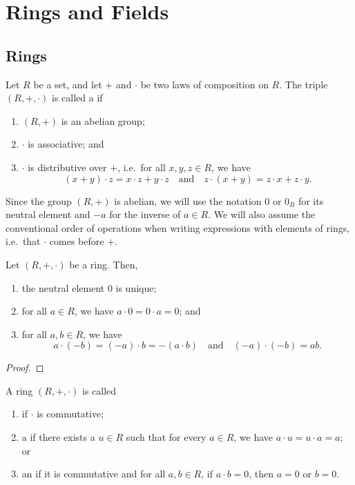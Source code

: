 \chapter{Rings and Fields}

\section{Rings}

\begin{defn}
Let $ R $ be a set, and let $ + $ and $ \cdot $ be two laws of composition on $ R $. The triple $ (R,+,\cdot) $ is called a  if
\begin{enumerate}
    \item $ (R,+) $ is an abelian group;
    \item $ \cdot $ is associative; and
    \item $ \cdot $ is distributive over $ + $, i.e.\ for all $ x,y,z\in R $, we have
    \begin{equation*}
        (x+y)\cdot z=x\cdot z+y\cdot z \quad\text{and}\quad z\cdot(x+y)=z\cdot x+z\cdot y.
    \end{equation*}
\end{enumerate}
\end{defn}

Since the group $ (R,+) $ is abelian, we will use the notation $ 0 $ or $ 0_R $ for its neutral element and $ -a $ for the inverse of $ a\in R $. We will also assume the conventional order of operations when writing expressions with elements of rings, i.e.\ that $ \cdot $ comes before $ + $.

\begin{prop}
Let $ (R,+,\cdot) $ be a ring. Then,
\begin{enumerate}
    \item the neutral element $ 0 $ is unique;
    \item for all $ a\in R $, we have $ a\cdot 0=0\cdot a=0 $; and
    \item for all $ a,b\in R $, we have
    \begin{equation*}
        a\cdot(-b)=(-a)\cdot b=-(a\cdot b) \quad\text{and}\quad (-a)\cdot(-b)=ab.
    \end{equation*}
\end{enumerate}
\end{prop}
\begin{proof}
\end{proof}

\begin{defn}\label{defn:ring_types}
A ring $ (R,+,\cdot) $ is called
\begin{enumerate}
    \item {} if $ \cdot $ is commutative;
    \item a  if there exists a $ u\in R $ such that for every $ a\in R $, we have $ a\cdot u=u\cdot a=a $; or
    \item an  if it is commutative and for all $ a,b\in R $, if $ a\cdot b=0 $, then $ a=0 $ or $ b=0 $.
\end{enumerate}
\end{defn}

